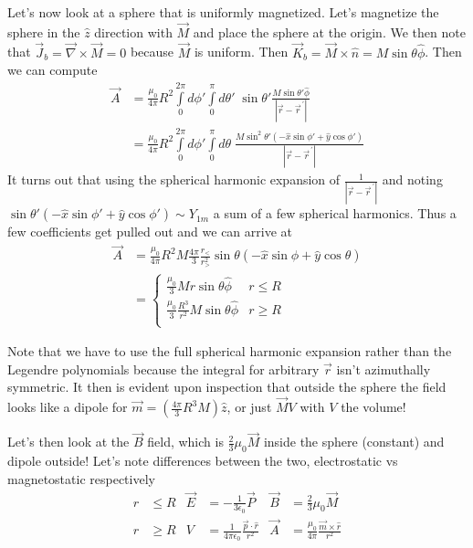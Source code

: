 \documentclass[10pt]{report}
\newcommand{\pvec}[1]{\vec{#1}^{\,\prime}}
\newcommand{\abs}[1]{\left|#1\right|}
\begin{document}
Let's now look at a sphere that is uniformly magnetized. Let's magnetize the sphere in the $\hat{z}$ direction with $\vec{M}$ and place the sphere at the origin. We then note that $\vec{J}_b = \vec{\nabla}\times \vec{M}= 0$ because $\vec{M}$ is uniform. Then $\vec{K}_b = \vec{M} \times \hat{n} = M\sin\theta \hat{ \phi}$. Then we can compute
\begin{align}
    \vec{A} &= \frac{\mu_0}{4\pi}R^2 \int\limits_{0}^{2\pi}d\phi'\int\limits_{0}^{\pi}d\theta'\;\sin\theta' \frac{M\sin\theta' \hat{\phi}}{\abs{\vec{r} - \pvec{r}}}\\
    &= \frac{\mu_0}{4\pi}R^2 \int\limits_{0}^{2\pi}d\phi'\int\limits_{0}^{\pi}d\theta\;\frac{M\sin^2\theta'\left( -\hat{x}\sin \phi' + \hat{y}\cos \phi' \right)}{\abs{\vec{r} - \pvec{r}}}
\end{align}
It turns out that using the spherical harmonic expansion of $\frac{1}{\abs{\vec{r} - \pvec{r}}}$ and noting $\sin\theta'(-\hat{x}\sin\phi' + \hat{y}\cos\phi') \sim Y_{1m}$ a sum of a few spherical harmonics. Thus a few coefficients get pulled out and we can arrive at
\begin{align}
    \vec{A} &= \frac{\mu_0}{4\pi}R^2M\frac{4\pi}{3}\frac{r_<}{r_>^2}\sin\theta\left( -\hat{x}\sin\phi + \hat{y}\cos\theta \right)\\
    &= \begin{cases}
        \frac{\mu_0}{3}Mr\sin\theta\hat{\phi} & r \leq R\\[10pt]
        \frac{\mu_0}{3}\frac{R^3}{r^2}M\sin\theta\hat{\phi} & r \geq R\\
    \end{cases}
\end{align}

Note that we have to use the full spherical harmonic expansion rather than the Legendre polynomials because the integral for arbitrary $\vec{r}$ isn't azimuthally symmetric. It then is evident upon inspection that outside the sphere the field looks like a dipole for $\vec{m} = \left( \frac{4\pi}{3}R^3M \right)\hat{z}$, or just $\vec{M}V$ with $V$ the volume! 

Let's then look at the $\vec{B}$ field, which is $\frac{2}{3}\mu_0\vec{M}$ inside the sphere (constant) and dipole outside! Let's note differences between the two, electrostatic vs magnetostatic respectively
\begin{align}
    r & \leq R & \vec{E} &= -\frac{1}{3\epsilon_0}\vec{P} & \vec{B} &= \frac{2}{3}\mu_0 \vec{M}\\
    r & \geq R & V &= \frac{1}{4\pi\epsilon_0} \frac{\vec{p}\cdot \hat{r}}{r^2} & \vec{A} &= \frac{\mu_0}{4\pi}\frac{\vec{m}\times \hat{r}}{r^2}
\end{align}
\end{document}
